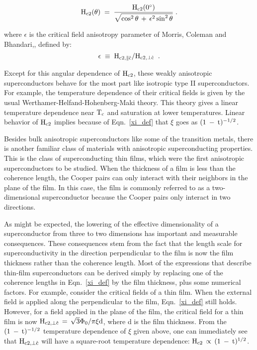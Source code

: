 \begin{equation}
\rm H_{c2}(\theta) \; = \; \frac{H_{c2}(0^{\circ})}{\sqrt{\cos^2\theta \,
+ \, \epsilon^2 \sin^2\theta}} \; .
\label{ldtheor1}
\end{equation}

\noindent  where $\epsilon$ is the critical field anisotropy parameter of Morris, Coleman
and Bhandari,\cite{morris72}, defined by:\\

\[ \rm \epsilon \; \equiv \; H_{c2,\parallel \hat{c}}/ H_{c2,\perp \hat{c}} \; \; .
\]

\noindent Except for this    angular dependence  of  $\rm   H_{c2}$,  these  
weakly anisotropic superconductors behave for  the most part like isotropic
type II superconductors.  For  example, the temperature dependence of their
critical  fields   is given by   the usual Werthamer-Helfand-Hohenberg-Maki
theory.\cite{degennes66} This  theory gives a linear temperature dependence
near  $\rm T_c$ and saturation at   lower temperatures.  Linear behavior of
$\rm H_{c2}$ implies because of Eqn.~\ref{xi_def} that $\xi$ goes as $\rm (1
\: - \: t)^{-1/2}$.

        Besides    bulk anisotropic   superconductors    like  some  of the
transition  metals,  there  is another  familiar  class  of materials  with
anisotropic     superconducting  properties.     This   is    the  class of
superconducting  thin   films,    which    were the    first    anisotropic
superconductors to  be studied.\cite{tinkham63,burger65} When the thickness
of a film  is  less than  the coherence length,  the Cooper pairs  can only
interact with their neighbors in the plane of  the film.  In this case, the
film  is  commonly referred to  as a two-dimensional superconductor because
the Cooper pairs only interact in two directions.

        As might be expected, the lowering of  the effective dimensionality
of  a  superconductor  from three  to   two   dimensions has important  and
measurable consequences.  These consequences  stem  from the  fact that the
length scale for superconductivity  in  the direction perpendicular  to the
film is now the film thickness  rather than the  coherence length.  Most of
the  expressions that  describe thin-film superconductors   can  be derived
simply by  replacing one of the  coherence lengths in  Eqn.~\ref{xi_def} by
the film thickness, plus some numerical factors.  For example, consider the
critical fields of a thin film.  When  the external  field is applied along
the perpendicular to the film, Eqn.~\ref{xi_def} still holds.  However, for
a field applied in the plane of the film, the critical field for a thin
film is now $\rm H_{c2,
\perp \hat{c}}\, = \, \sqrt{3}\Phi_0 /
\pi  \xi d$,  where   d  is  the  film thickness.\cite{tinkham80}   From the
$\rm (1 \: - \: t)^{-1/2}$ temperature dependence of $\xi$ given above, one
can immediately  see that   $\rm    H_{c2,   \perp  \hat{c}}$  will have  a
square-root temperature  dependence: $\rm H_{c2} \, \propto  \, (1 \:  - \:
t)^{1/2}$.\cite{tinkham63,harper68}

